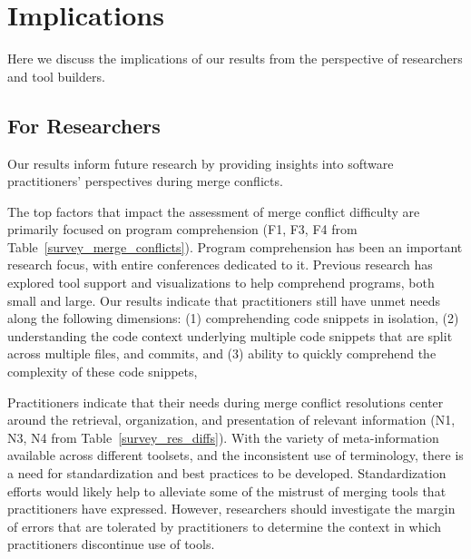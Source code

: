 \section{Implications}\label{implications}
Here we discuss the implications of our results from the perspective of researchers and tool builders.

\subsection{For Researchers}
Our results inform future research by providing insights into software practitioners' perspectives during merge conflicts.

The top factors that impact the assessment of merge conflict difficulty are primarily focused on program comprehension (F1, F3, F4 from Table~\ref{survey_merge_conflicts}).
Program comprehension has been an important research focus, with entire conferences dedicated to it.
Previous research has explored tool support and visualizations to help comprehend programs, both small and large.
Our results indicate that practitioners still have unmet needs along the following dimensions: (1) comprehending code snippets in isolation, (2) understanding the code context underlying multiple code snippets that are split across multiple files, and commits, and (3) ability to quickly comprehend the complexity of these code snippets, 


Practitioners indicate that their needs during merge conflict resolutions center around the retrieval, organization, and presentation of relevant information (N1, N3, N4 from Table~\ref{survey_res_diffs}).
With the variety of meta-information available across different toolsets, and the inconsistent use of terminology, there is a need for standardization and best practices to be developed.
Standardization efforts would likely help to alleviate some of the mistrust of merging tools that practitioners have expressed.
However, researchers should investigate the margin of errors that are tolerated by practitioners to determine the context in which practitioners discontinue use of tools.

